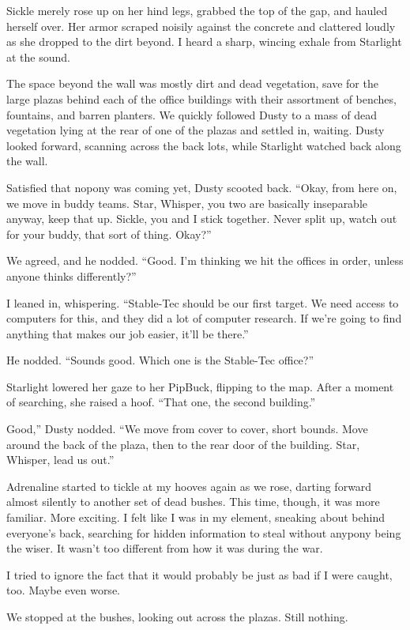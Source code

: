 Sickle merely rose up on her hind legs, grabbed the top of the gap, and hauled herself over. Her armor scraped noisily against the concrete and clattered loudly as she dropped to the dirt beyond. I heard a sharp, wincing exhale from Starlight at the sound.

The space beyond the wall was mostly dirt and dead vegetation, save for the large plazas behind each of the office buildings with their assortment of benches, fountains, and barren planters. We quickly followed Dusty to a mass of dead vegetation lying at the rear of one of the plazas and settled in, waiting. Dusty looked forward, scanning across the back lots, while Starlight watched back along the wall.

Satisfied that nopony was coming yet, Dusty scooted back. “Okay, from here on, we move in buddy teams. Star, Whisper, you two are basically inseparable anyway, keep that up. Sickle, you and I stick together. Never split up, watch out for your buddy, that sort of thing. Okay?”

We agreed, and he nodded. “Good. I’m thinking we hit the offices in order, unless anyone thinks differently?”

I leaned in, whispering. “Stable-Tec should be our first target. We need access to computers for this, and they did a lot of computer research. If we’re going to find anything that makes our job easier, it’ll be there.”

He nodded. “Sounds good. Which one is the Stable-Tec office?”

Starlight lowered her gaze to her PipBuck, flipping to the map. After a moment of searching, she raised a hoof. “That one, the second building.”

\leavevmode{}Good,” Dusty nodded. “We move from cover to cover, short bounds. Move around the back of the plaza, then to the rear door of the building. Star, Whisper, lead us out.”

Adrenaline started to tickle at my hooves again as we rose, darting forward almost silently to another set of dead bushes. This time, though, it was more familiar. More exciting. I felt like I was in my element, sneaking about behind everyone’s back, searching for hidden information to steal without anypony being the wiser. It wasn’t too different from how it was during the war.

I tried to ignore the fact that it would probably be just as bad if I were caught, too. Maybe even worse.

We stopped at the bushes, looking out across the plazas. Still nothing.

